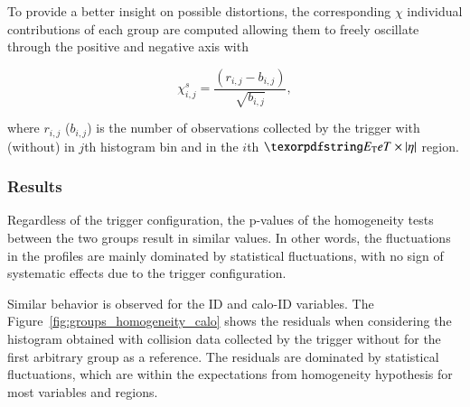 To provide a better insight on possible distortions, the corresponding $\chi$
individual contributions of each group are computed allowing them to freely
oscillate through the positive and negative axis with

\begin{equation}
  \chi_{i,j}^{s} = \frac{(r_{i,j} - b_{i,j})}{\sqrt{b_{i,j}}},
  \label{eq:signed_chi}
\end{equation}

\noindent where $r_{i,j}$ ($b_{i,j}$) is the number of observations collected by
the trigger with (without) \rnn{} in $j$th histogram bin and in the $i$th
$\et{}\times\abseta{}$ region.


\subsubsection{Results}\label{top:agreement_homogeneity_results}




Regardless of the trigger configuration, the p-values of the homogeneity tests between the two groups result in similar values. In other words, the fluctuations in the profiles are mainly dominated by statistical fluctuations, with no sign of systematic effects due to the trigger configuration. 

Similar behavior is observed for the ID and calo-ID variables. The Figure~\ref{fig:groups_homogeneity_calo} shows the residuals when considering the histogram obtained with collision data collected by the trigger without \rnn{} for the first arbitrary group as a reference. The residuals are dominated by statistical fluctuations, which are within the expectations from homogeneity hypothesis for most variables and regions.


